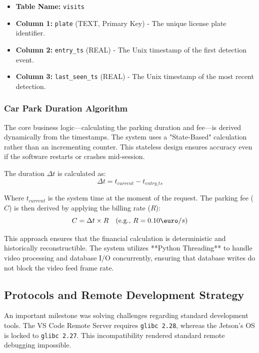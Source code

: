 \begin{itemize}
	\item \textbf{Table Name:} \texttt{visits}
	\item \textbf{Column 1:} \texttt{plate} (TEXT, Primary Key) - The unique license plate identifier.
	\item \textbf{Column 2:} \texttt{entry\_ts} (REAL) - The Unix timestamp of the first detection event.
	\item \textbf{Column 3:} \texttt{last\_seen\_ts} (REAL) - The Unix timestamp of the most recent detection.
\end{itemize}

\subsubsection{Car Park Duration Algorithm}
The core business logic—calculating the parking duration and fee—is derived dynamically from the timestamps. The system uses a "State-Based" calculation rather than an incrementing counter. This stateless design ensures accuracy even if the software restarts or crashes mid-session.

The duration $\Delta t$ is calculated as:
\begin{equation}
	\Delta t = t_{current} - t_{entry\_ts}
\end{equation}

Where $t_{current}$ is the system time at the moment of the request. The parking fee ($C$) is then derived by applying the billing rate ($R$):
\begin{equation}
	C = \Delta t \times R \quad (\text{e.g., } R = 0.10 \text{\euro}/s)
\end{equation}

This approach ensures that the financial calculation is deterministic and historically reconstructible. The system utilizes **Python Threading** to handle video processing and database I/O concurrently, ensuring that database writes do not block the video feed frame rate.

\subsection{Protocols and Remote Development Strategy}

An important milestone was solving challenges regarding standard development tools. The VS Code Remote Server requires \texttt{glibc 2.28}, whereas the Jetson's OS is locked to \texttt{glibc 2.27}. This incompatibility rendered standard remote debugging impossible.

